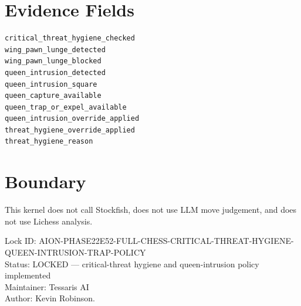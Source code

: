 \documentclass[11pt,a4paper]{article}
\begin{document}
\section{Evidence Fields}

\begin{verbatim}
critical_threat_hygiene_checked
wing_pawn_lunge_detected
wing_pawn_lunge_blocked
queen_intrusion_detected
queen_intrusion_square
queen_capture_available
queen_trap_or_expel_available
queen_intrusion_override_applied
threat_hygiene_override_applied
threat_hygiene_reason
\end{verbatim}

\section{Boundary}

This kernel does not call Stockfish, does not use LLM move judgement, and does not use Lichess analysis.

\bigskip

\noindent
Lock ID: AION-PHASE22E52-FULL-CHESS-CRITICAL-THREAT-HYGIENE-QUEEN-INTRUSION-TRAP-POLICY\\
Status: LOCKED --- critical-threat hygiene and queen-intrusion policy implemented\\
Maintainer: Tessaris AI\\
Author: Kevin Robinson.
\end{document}

